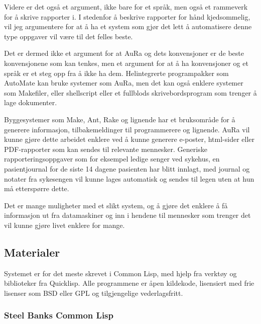 \documentclass[norsk, 11pt, a4paper]{article}
\begin{document}
Videre er det også et argument, ikke bare for et språk, men også et rammeverk for å skrive rapporter i. I stedenfor å beskrive rapporter for hånd kjedsommelig, vil jeg argumentere for at å ha et system som gjør det lett å automatisere denne type oppgaver vil være til det felles beste.



Det er dermed ikke et argument for at AuRa og dets konvensjoner er de beste konvensjonene som kan tenkes, men et argument for at å ha konvensjoner og et språk er et steg opp fra å ikke ha dem. Helintegrerte programpakker som AutoMate kan bruke systemer som AuRa, men det kan også enklere systemer som Makefiler, eller shellscript eller et fullblods skrivebordsprogram som trenger å lage dokumenter.



Byggesystemer som Make, Ant, Rake og lignende har et bruksområde for å generere informasjon, tilbakemeldinger til programmerere og lignende. AuRa vil kunne gjøre dette arbeidet enklere ved å kunne generere e-poster, html-sider eller PDF-rapporter som kan sendes til relevante mennesker.
Generiske rapporteringsoppgaver som for eksempel ledige senger ved sykehus, en pasientjournal for de siste 14 dagene pasienten har blitt innlagt, med journal og notater fra sykesengen vil kunne lages automatisk og sendes til legen uten at hun må etterspørre dette.



Det er mange muligheter med et slikt system, og å gjøre det enklere å få informasjon ut fra datamaskiner og inn i hendene til mennesker som trenger det vil kunne gjøre livet enklere for mange.




\subsection{Materialer}



Systemet er for det meste skrevet i Common Lisp, med hjelp fra verktøy og biblioteker fra Quicklisp.
Alle programmene er åpen kildekode, lisensiert med frie lisenser som BSD eller GPL og tilgjengelige vederlagsfritt.



\subsubsection{Steel Banks Common Lisp}
\end{document}
